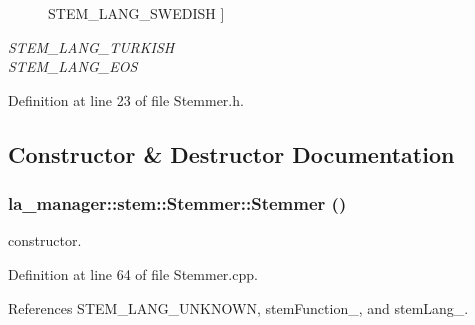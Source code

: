 \begin{CompactItemize}
\begin{Desc}
\begin{description}
{\hypertarget{classla__manager_1_1stem_1_1Stemmer_9b35ed1ce313d309f8c7235f7052e73e649924e5a6bdede8f2ebf229a74ab55f}{
STEM\_\-LANG\_\-SWEDISH}
\label{classla__manager_1_1stem_1_1Stemmer_9b35ed1ce313d309f8c7235f7052e73e649924e5a6bdede8f2ebf229a74ab55f}
}]\item[{\em 
\hypertarget{classla__manager_1_1stem_1_1Stemmer_9b35ed1ce313d309f8c7235f7052e73ec67c8d74c084aa2aa2bbe20333329f0d}{
STEM\_\-LANG\_\-TURKISH}
\label{classla__manager_1_1stem_1_1Stemmer_9b35ed1ce313d309f8c7235f7052e73ec67c8d74c084aa2aa2bbe20333329f0d}
}]\item[{\em 
\hypertarget{classla__manager_1_1stem_1_1Stemmer_9b35ed1ce313d309f8c7235f7052e73e826b3d8ecab89bcfe59eadd7ad77772d}{
STEM\_\-LANG\_\-EOS}
\label{classla__manager_1_1stem_1_1Stemmer_9b35ed1ce313d309f8c7235f7052e73e826b3d8ecab89bcfe59eadd7ad77772d}
}]\end{description}
\end{Desc}



Definition at line 23 of file Stemmer.h.

\subsection{Constructor \& Destructor Documentation}
\hypertarget{classla__manager_1_1stem_1_1Stemmer_45be8edf4092fd45cdc2372add2b225a}{
\subsubsection[{Stemmer}]{\setlength{\rightskip}{0pt plus 5cm}la\_\-manager::stem::Stemmer::Stemmer ()}}
\label{classla__manager_1_1stem_1_1Stemmer_45be8edf4092fd45cdc2372add2b225a}


constructor. 

Definition at line 64 of file Stemmer.cpp.

References STEM\_\-LANG\_\-UNKNOWN, stemFunction\_\-, and stemLang\_\-.\hypertarget{classla__manager_1_1stem_1_1Stemmer_e54d92f62c8e22bd9576d37358f9b40b}{
}
\end{CompactItemize}
